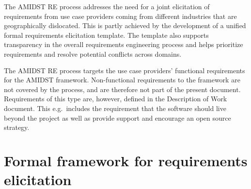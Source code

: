 \documentclass[11pt, oneside]{article}   	%
\begin{document}
The AMIDST RE process addresses the need for a joint elicitation of requirements from use case providers coming from
different industries that are geographically dislocated. This is partly achieved by the development of a 
unified formal requirements elicitation template. The template also supports transparency in the overall
requirements engineering process and helps prioritize requirements and resolve potential conflicts across domains.  

The AMIDST RE process targets the use case providers' functional requirements for the AMIDST framework. Non-functional requirements to the framework are not covered by the process,
and are therefore not part of the present document. Requirements of this type are, however, defined in the Description
of Work document. This e.g.\ includes the requirement that the software should live beyond the project as well as
provide support and
encourage an open source strategy.


\newpage














\appendix


\section{Formal framework for requirements elicitation}
\label{sec:form-fram-requ}
%
%

\end{document}
